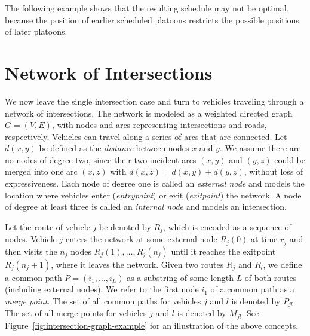 \documentclass{article}
\newcommand{\inline}[1]{ {\color{blue}{#1}}\addcontentsline{tdo}{todo}{#1}}
\theoremstyle{definition}
\theoremstyle{plain}
\begin{document}
The following example shows that the resulting schedule may not be optimal,
because the position of earlier scheduled platoons restricts the possible
positions of later platoons.
\begin{eg}
  \inline{come up with example}
\end{eg}


\newpage

\section{Network of Intersections}

We now leave the single intersection case and turn to vehicles traveling through
a network of intersections. The network is modeled as a weighted directed graph
$G=(V,E)$, with nodes and arcs representing intersections and roads,
respectively. Vehicles can travel along a series of arcs that are connected. Let
$d(x,y)$ be defined as the \textit{distance} between nodes $x$ and $y$. We
assume there are no nodes of degree two, since their two incident arcs $(x,y)$
and $(y,z)$ could be merged into one arc $(x,z)$ with
$d(x,z) = d(x,y) + d(y,z)$, without loss of expressiveness. Each node of degree
one is called an \textit{external node} and models the location where vehicles
enter (\textit{entrypoint}) or exit (\textit{exitpoint}) the network. A node of
degree at least three is called an \textit{internal node} and models an
intersection.

Let the route of vehicle $j$ be denoted by $R_{j}$, which is encoded as a
sequence of nodes. Vehicle $j$ enters the network at some external node
$R_{j}(0)$ at time $r_{j}$ and then visits the $n_{j}$ nodes
$R_{j}(1), \dots, R_{j}(n_{j})$ until it reaches the exitpoint
$R_{j}(n_{j} + 1)$, where it leaves the network.
Given two routes $R_{j}$ and $R_{l}$, we define a common path
$P=(i_{1},\dots,i_{L})$ as a substring of some length $L$ of both routes
(including external nodes). We refer to the first node $i_{1}$ of a common path
as a \textit{merge point}. The set of all common paths for vehicles $j$ and $l$
is denoted by $P_{jl}$. The set of all merge points for vehicles $j$ and $l$ is
denoted by $M_{jl}$. See Figure~\ref{fig:intersection-graph-example} for an
illustration of the above concepts.
\end{document}
